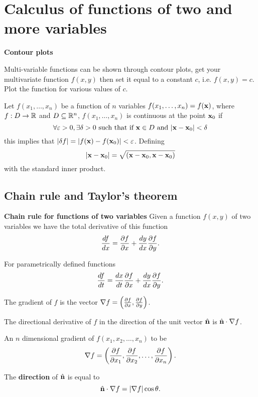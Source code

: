 \documentclass[10pt, a4paper]{article}
\begin{document}
\newpage

\section{Calculus of functions of two and more variables}

\textbf{Contour plots}

Multi-variable functions can be shown through contour plots,
get your multivariate function $f(x, y)$ then set it equal to a constant $c$,
i.e. $f(x, y) = c$.
Plot the function for various values of $c$.

\begin{definition}
    Let $f(x_1, \dotsc, x_n)$ be a function of $n$ variables $f(x_1, \dotsc, x_n) = f(\mbf{x})$,
    where $f : D \to \R$ and $D \subseteq \R ^ n$,
    $f(x_1, \dotsc, x_n)$ is continuous at the point $\mbf{x}_0$ if
    \[
    \forall \varepsilon > 0, \exists \delta > 0\text{ such that if } \mbf{x} \in D\text{ and } |\mbf{x} - \mbf{x}_0| < \delta
    \]
    this implies that $|\delta f| = |f(\mbf{x}) - f(\mbf{x}_0)| < \varepsilon$.
    Defining
    \[
    |\mbf{x} - \mbf{x}_0| = \sqrt{(\mbf{x} - \mbf{x}_0, \mbf{x} - \mbf{x}_0)}
    \]
    with the standard inner product.
\end{definition}

\subsection{Chain rule and Taylor's theorem}

\textbf{Chain rule for functions of two variables}
Given a function $f(x, y)$ of two variables we have the total derivative of this function
\[
\frac{df}{dx} = \pd[f]{x} + \frac{dy}{dx}\pd[f]{y}.
\]

For parametrically defined functions
\[
\frac{df}{dt} = \frac{dx}{dt}\pd[f]{x} + \frac{dy}{dx}\pd[f]{y}.
\]

The gradient of $f$ is the vector $\nabla f = \left(\pd[f]{x}, \pd[f]{y}\right)$.

The directional derivative of $f$ in the direction of the unit vector $\hat{\mbf{n}}$ is $\hat{\mbf{n}}\cdot\nabla f$.

An $n$ dimensional gradient of $f(x_1, x_2, \dotsc, x_n)$ to be
\[
\nabla f = \left(\pd[f]{x_1}, \pd[f]{x_2}, \dotsc, \pd[f]{x_n}\right).
\]

The \textbf{direction} of $\hat{\mbf{n}}$ is equal to
\[
\hat{\mbf{n}}\cdot \nabla f = |\nabla f|\cos{\theta}.
\]
\end{document}
